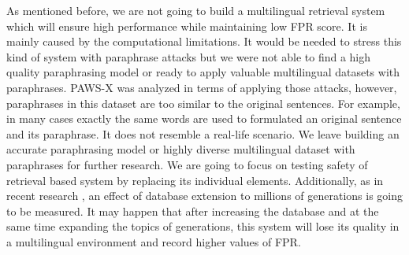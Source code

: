 \documentclass[12pt]{report}
\begin{document}
\newline \newline
As mentioned before, we are not going to build a multilingual retrieval system which will ensure high performance while maintaining low FPR score. It is mainly caused by the computational limitations. It would be needed to stress this kind of system with paraphrase attacks but we were not able to find a high quality paraphrasing model or ready to apply valuable multilingual datasets with paraphrases. PAWS-X \cite{yang2019paws} was analyzed in terms of applying those attacks, however, paraphrases in this dataset are too similar to the original sentences. For example, in many cases exactly the same words are used to formulated an original sentence and its paraphrase. It does not resemble a real-life scenario. We leave building an accurate paraphrasing model or highly diverse multilingual dataset with paraphrases for further research. We are going to focus on testing safety of retrieval based system by replacing its individual elements. Additionally, as in recent research \cite{krishna2023paraphrasing}, an effect of database extension to millions of generations is going to be measured. It may happen that after increasing the database and at the same time expanding the topics of generations, this system will lose its quality in a multilingual environment and record higher values of FPR.
\newline \newline
\end{document}
